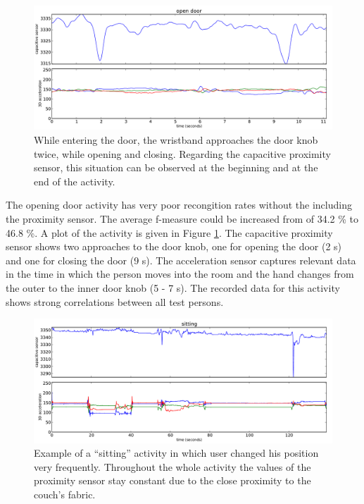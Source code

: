 \documentclass[runningheads,a4paper]{llncs}
\begin{document}
\begin{figure}
	\centering
		\includegraphics[width=1.00\textwidth]{../Auswertung/images/tobias_1.pdf}
	\caption{While entering the door, the wristband approaches the door knob twice, while opening and closing. Regarding the capacitive proximity sensor, this situation can be observed at the beginning and at the end of the activity.}
	\label{fig:tobias_1}
\end{figure}

The opening door activity has very poor recongition rates without the including the proximity sensor. The average f-measure could be increased from of 34.2 \% to 46.8 \%. A plot of the activity is given in Figure \ref{fig:tobias_1}. The capacitive proximity sensor shows two approaches to the door knob, one for opening the door (2 s) and one for closing the door (9 s). The acceleration sensor captures relevant data in the time in which the person moves into the room and the hand changes from the outer to the inner door knob (5 - 7 s). The recorded data for this activity shows strong correlations between all test persons. 

\begin{figure}
	\centering
		\includegraphics[width=1.00\textwidth]{../Auswertung/images/eugen_2.pdf}
	\caption{Example of a ``sitting'' activity in which user changed his position very frequently. Throughout the whole activity the values of the proximity sensor stay constant due to the close proximity to the couch's fabric.}
	\label{fig:eugen_2}
\end{figure}
\end{document}
